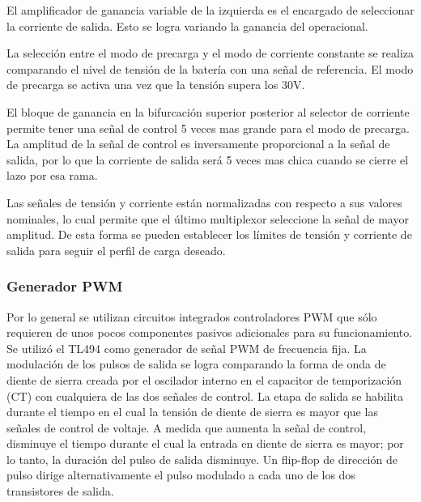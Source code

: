 El amplificador de ganancia variable de la izquierda es el encargado de seleccionar la corriente de salida.
Esto se logra variando la ganancia del operacional.

La selección entre el modo de precarga y el modo de corriente constante se realiza comparando el nivel de tensión de la batería con una señal de referencia.
El modo de precarga se activa una vez que la tensión supera los 30V.

El bloque de ganancia en la bifurcación superior posterior al selector de corriente permite tener una señal de control 5 veces mas grande para el modo de precarga.
La amplitud de la señal de control es inversamente proporcional a la señal de salida,
por lo que la corriente de salida será 5 veces mas chica cuando se cierre el lazo por esa rama.

Las señales de tensión y corriente están normalizadas con respecto a sus valores nominales, lo cual permite que el último multiplexor seleccione la señal de mayor amplitud. De esta forma se pueden establecer los límites de tensión y corriente de salida para seguir el perfil de carga deseado.

\subsubsection{Generador PWM}

Por lo general se utilizan circuitos integrados controladores PWM que sólo requieren de unos pocos componentes pasivos adicionales para su funcionamiento. 
Se utilizó el TL494 como generador de señal PWM de frecuencia fija. 
La modulación de los pulsos de salida se logra comparando la forma de onda de diente de sierra creada por el oscilador interno en el capacitor de temporización (CT) con cualquiera de las dos señales de control. 
La etapa de salida se habilita durante el tiempo en el cual la tensión de diente de sierra es mayor que las señales de control de voltaje. 
A medida que aumenta la señal de control, disminuye el tiempo durante el cual la entrada en diente de sierra es mayor; por lo tanto, la duración del pulso de salida disminuye. 
Un flip-flop de dirección de pulso dirige alternativamente el pulso modulado a cada uno de los dos transistores de salida.

